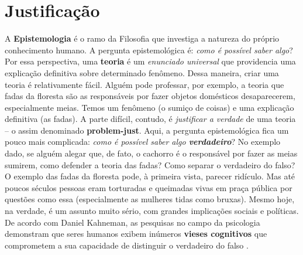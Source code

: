 \documentclass[./main.tex]{subfiles}
\begin{document}
\section{Justificação} \label{sec:epis:justific}

\par A \textbf{Epistemologia} é o ramo da Filosofia que investiga a natureza do próprio conhecimento humano. A pergunta epistemológica é: \textit{como é possível saber algo}? Por essa perspectiva, uma \textbf{\gls{teoria}} é um \textit{enunciado universal} que providencia uma explicação definitiva sobre determinado fenômeno. Dessa maneira, criar uma teoria é relativamente fácil. Alguém pode professar, por exemplo, a teoria que fadas da floresta são as responsáveis por fazer objetos domésticos desaparecerem, especialmente meias. Temos um fenômeno (o sumiço de coisas) e uma explicação definitiva (as fadas). A parte difícil, contudo, é \textit{justificar a verdade} de uma teoria -- o assim denominado \textbf{\gls{problem-just}}. Aqui, a pergunta epistemológica fica um pouco mais complicada: \textit{como é possível saber algo \textbf{verdadeiro}}? No exemplo dado, se alguém alegar que, de fato, o cachorro é o responsável por fazer as meias sumirem, como defender a teoria das fadas? Como separar o verdadeiro do falso? O exemplo das fadas da floresta pode, à primeira vista, parecer ridículo. Mas até poucos séculos pessoas eram torturadas e queimadas vivas em praça pública por questões como essa (especialmente as mulheres tidas como bruxas). Mesmo hoje, na verdade, é um assunto muito sério, com grandes implicações sociais e políticas. De acordo com Daniel Kahneman, as pesquisas no campo da psicologia demonstram que seres humanos exibem inúmeros \textbf{vieses cognitivos} que comprometem a sua capacidade de distinguir o verdadeiro do falso \cite{kahneman2011}.  
\end{document}
